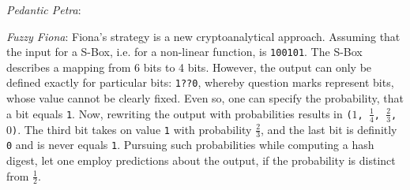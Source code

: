 \documentclass{acmtrans2m}
\begin{document}
\begin{describe}{{\em Pedantic Petra\/}:}
\item[{\em Fuzzy Fiona\/}:]
Fiona's strategy is a new cryptoanalytical approach. Assuming that
the input for a S-Box, i.e. for a non-linear function, is \texttt{100101}.
The S-Box describes a mapping from 6 bits to 4 bits. However, 
the output can only be defined exactly for particular bits: \texttt{1??0},
whereby question marks represent bits, whose value cannot be
clearly fixed. Even so, one can specify the probability, that a bit
equals \texttt{1}. Now, rewriting the output with probabilities results
in \texttt{($1$, $\frac{1}{4}$, $\frac{2}{3}$, $0$)}. The third bit 
takes on value \texttt{1} with probability $\frac{2}{3}$, and the last bit
is definitly \texttt{0} and is never equals \texttt{1}.
Pursuing such probabilities while computing a hash digest, let one
employ predictions about the output, if the probability is distinct from $\frac{1}{2}$.
\end{describe}

\vfill

\end{document}
